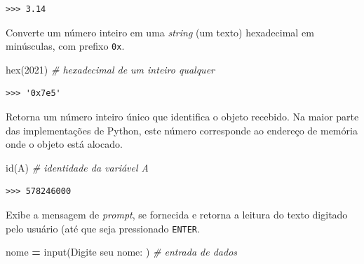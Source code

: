 \documentclass[
]{book}
\newenvironment{Shaded}{\begin{snugshade}}{\end{snugshade}}
\newcommand{\BuiltInTok}[1]{#1}
\newcommand{\CommentTok}[1]{\textcolor[rgb]{0.56,0.35,0.01}{\textit{#1}}}
\newcommand{\DecValTok}[1]{\textcolor[rgb]{0.00,0.00,0.81}{#1}}
\newcommand{\NormalTok}[1]{#1}
\newcommand{\OperatorTok}[1]{\textcolor[rgb]{0.81,0.36,0.00}{\textbf{#1}}}
\newcommand{\StringTok}[1]{\textcolor[rgb]{0.31,0.60,0.02}{#1}}
\providecommand{\tightlist}{%
  \setlength{\itemsep}{0pt}\setlength{\parskip}{0pt}}
\begin{document}
\begin{verbatim}
>>> 3.14
\end{verbatim}

\begin{description}
\tightlist
\item[\texttt{hex(x)}]
Converte um número inteiro em uma \emph{string} (um texto) hexadecimal em minúsculas, com prefixo \texttt{0x}.
\end{description}

\begin{Shaded}
\begin{Highlighting}[]
\BuiltInTok{hex}\NormalTok{(}\DecValTok{2021}\NormalTok{) }\CommentTok{\# hexadecimal de um inteiro qualquer}
\end{Highlighting}
\end{Shaded}

\begin{verbatim}
>>> '0x7e5'
\end{verbatim}

\begin{description}
\tightlist
\item[\texttt{id(objeto)}]
Retorna um número inteiro único que identifica o objeto recebido. Na maior parte das implementações de Python, este número corresponde ao endereço de memória onde o objeto está alocado.
\end{description}

\begin{Shaded}
\begin{Highlighting}[]
\BuiltInTok{id}\NormalTok{(A) }\CommentTok{\# identidade da variável A}
\end{Highlighting}
\end{Shaded}

\begin{verbatim}
>>> 578246000
\end{verbatim}

\begin{description}
\tightlist
\item[\texttt{input(prompt)}]
Exibe a mensagem de \emph{prompt}, se fornecida e retorna a leitura do texto digitado pelo usuário (até que seja pressionado \texttt{ENTER}.
\end{description}

\begin{Shaded}
\begin{Highlighting}[]
\NormalTok{nome }\OperatorTok{=} \BuiltInTok{input}\NormalTok{(}\StringTok{\textquotesingle{}Digite seu nome: \textquotesingle{}}\NormalTok{) }\CommentTok{\# entrada de dados}
\end{Highlighting}
\end{Shaded}
\end{document}
